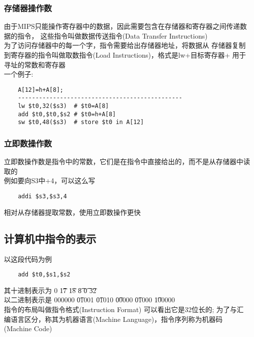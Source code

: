 \documentclass{ctexart}
\begin{document}
\subsubsection{存储器操作数}
由于MIPS只能操作寄存器中的数据，因此需要包含在存储器和寄存器之间传递数据的指令，
这些指令叫做数据传送指令(Data Transfer Instructions)\\
为了访问存储器中的每一个字，指令需要给出存储器地址，将数据从
存储器复制到寄存器的指令叫做取数指令(Load Instructions)，格式是lw+目标寄存器+
用于寻址的常数和寄存器\\
一个例子:\\
\begin{lstlisting}
    A[12]=h+A[8];
    -----------------------------------------------
    lw $t0,32($s3)  # $t0=A[8]
    add $t0,$t0,$s2 # $t0=h+A[8]
    sw $t0,48($s3)  # store $t0 in A[12]
\end{lstlisting}
\subsubsection{立即数操作数}
立即数操作数是指令中的常数，它们是在指令中直接给出的，而不是从存储器中读取的\\
例如要向S3中+4，可以这么写
\begin{lstlisting}
    addi $s3,$s3,4
\end{lstlisting}
相对从存储器提取常数，使用立即数操作更快\\
\subsection{计算机中指令的表示}
以这段代码为例
\begin{lstlisting}
    add $t0,$s1,$s2
\end{lstlisting}
其十进制表示为
0 \t 17 \t 18 \t 8 \t 0 \t 32 \\
以二进制表示是
000000 \t 01001 \t 01010 \t 00000 \t 01000 \t 100000 \\
指令的布局叫做指令格式(Instruction Format) 可以看出它是32位长的;
为了与汇编语言区分，称其为机器语言(Machine Language)，指令序列称为机器码(Machine Code)\\
\end{document}
